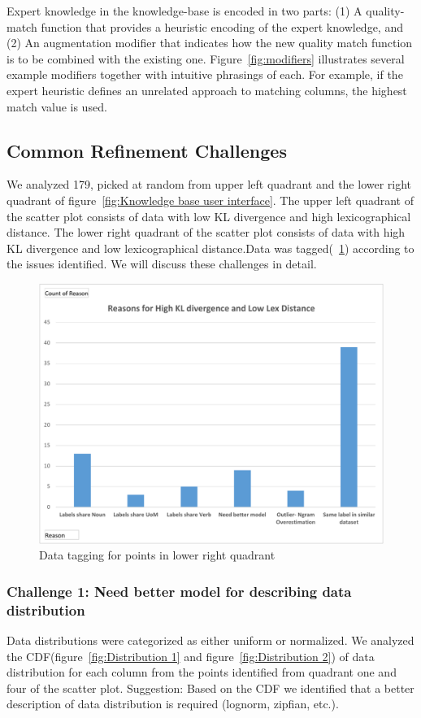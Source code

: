 Expert knowledge in the knowledge-base is encoded in two parts: 
(1) A quality-match function that provides a heuristic encoding of the expert knowledge, and 
(2) An augmentation modifier that indicates how the new quality match function is to be combined with the existing one.  
Figure~\ref{fig:modifiers} illustrates several example modifiers together with intuitive phrasings of each.  
For example, if the expert heuristic defines an unrelated approach to matching columns, the highest match value is used.


\subsection{Common Refinement Challenges}
We analyzed 179, picked at random from upper left quadrant and the lower right quadrant of figure~\ref{fig:Knowledge base user interface}. The upper left quadrant of the scatter plot consists of data with low KL divergence and high lexicographical distance. The lower right quadrant of the scatter plot consists of data with high KL divergence and low lexicographical distance.Data was tagged(~\ref{fig:Data tags for lower right quadrant}) according to the issues identified. We will discuss these challenges in detail.

\begin{figure}[H]
	\centering
	\includegraphics[width=0.8\columnwidth]{graphics/Lower_right_quad}
	\caption{Data tagging for points in lower right quadrant}
	\label{fig:Data tags for lower right quadrant}
\end{figure}

\subsubsection{Challenge 1: Need better model for describing data distribution}
Data distributions were categorized as either uniform or normalized. We analyzed the CDF(figure~\ref{fig:Distribution 1} and figure~\ref{fig:Distribution 2}) of data distribution for each column from the points identified from quadrant one and four of the scatter plot. 
Suggestion: Based on the CDF we identified that a better description of data distribution is required (lognorm, zipfian, etc.).

